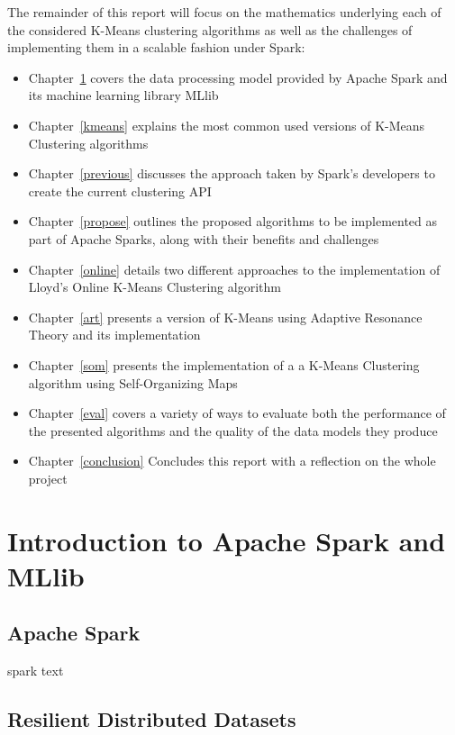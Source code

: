 \documentclass{l4proj}
\begin{document}
The remainder of this report will focus on the mathematics underlying each of the considered K-Means clustering algorithms as well as the challenges of implementing them in a scalable fashion under Spark:
\begin{itemize}
\item Chapter~\ref{spark} covers the data processing model provided by Apache Spark and its machine learning library MLlib
\item Chapter~\ref{kmeans} explains the most common used versions of K-Means Clustering algorithms
\item Chapter~\ref{previous} discusses the approach taken by Spark's developers to create the current clustering API
\item Chapter~\ref{propose} outlines the proposed algorithms to be implemented as part of Apache Sparks, along with their benefits and challenges
\item Chapter~\ref{online} details two different approaches to the implementation of Lloyd's Online K-Means Clustering algorithm
\item Chapter~\ref{art} presents a version of K-Means using Adaptive Resonance Theory and its implementation
\item Chapter~\ref{som} presents the implementation of a  a K-Means Clustering algorithm using Self-Organizing Maps
\item Chapter~\ref{eval} covers a variety of ways to evaluate both the performance of the presented algorithms and the quality of the data models they produce
\item Chapter~\ref{conclusion} Concludes this report with a reflection on the whole project
\end{itemize}


\chapter{Introduction to Apache Spark and MLlib}
\label{spark}
\section{Apache Spark}

spark text

\section{Resilient Distributed Datasets}
\end{document}
